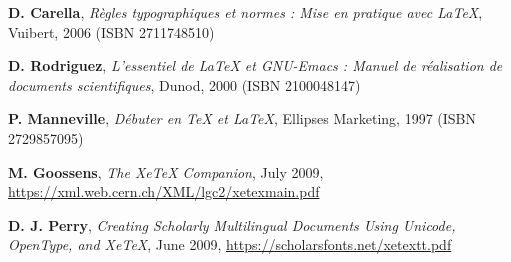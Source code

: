 \begin{thebibliography}{xx}
\textbf{D. Carella}, \textsl{Règles typographiques et normes : Mise en pratique avec {\LaTeX}}, Vuibert, 2006 (ISBN 2711748510)

\textbf{D. Rodriguez}, \textsl{L'essentiel de {\LaTeX} et GNU-Emacs : Manuel de réalisation de documents scientifiques}, Dunod, 2000 (ISBN 2100048147)

\textbf{P. Manneville}, \textsl{Débuter en {\TeX} et {LaTeX}}, Ellipses Marketing, 1997 (ISBN 2729857095)

\textbf{M. Goossens}, \textsl{The XeTeX Companion}, July 2009, \url{https://xml.web.cern.ch/XML/lgc2/xetexmain.pdf}

\textbf{D. J. Perry}, \textsl{Creating Scholarly Multilingual Documents Using Unicode, OpenType, and XeTeX}, June 2009, \url{https://scholarsfonts.net/xetextt.pdf}

\end{thebibliography}

\printindex
